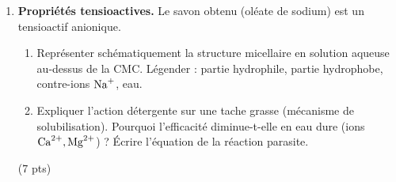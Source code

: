 \documentclass[11pt]{article}
\begin{document}
\begin{exercice}
\begin{enumerate}
\begin{enumerate}
    \end{enumerate}
    \item \textbf{Propriétés tensioactives.} Le savon obtenu (oléate de sodium) est un tensioactif anionique.
    \begin{enumerate}
        \item Représenter schématiquement la structure micellaire en solution aqueuse au-dessus de la CMC. Légender : partie hydrophile, partie hydrophobe, contre-ions $\ce{Na+}$, eau.
        \item Expliquer l'action détergente sur une tache grasse (mécanisme de solubilisation). Pourquoi l'efficacité diminue-t-elle en eau dure (ions $\ce{Ca^{2+}}, \ce{Mg^{2+}}$) ? Écrire l'équation de la réaction parasite.
    \end{enumerate}
    \hfill (7 pts)
\end{enumerate}
\end{exercice}
\end{document}
